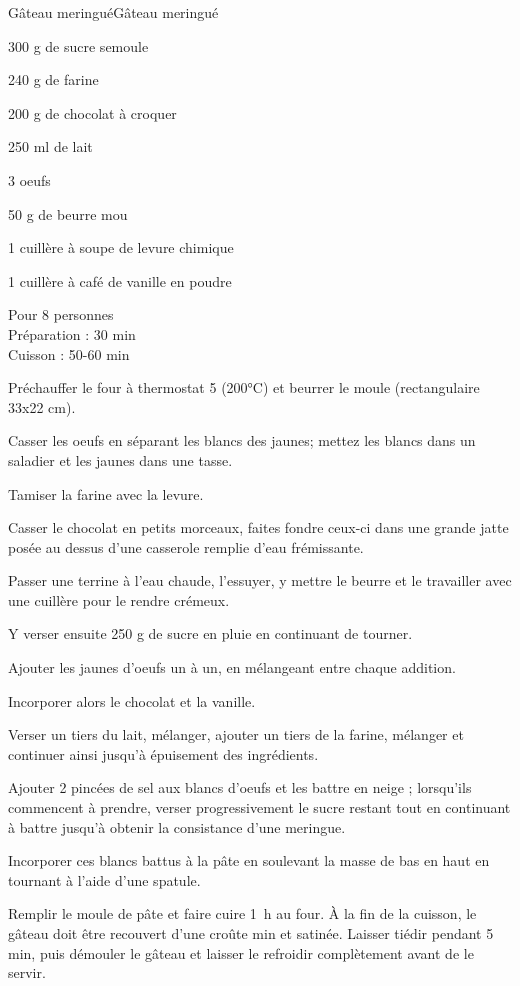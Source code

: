 \begin{recette}{Gâteau meringué}{Gâteau meringué}

\begin{ingredients}
300 g de sucre semoule\par
240 g de farine\par
200 g de chocolat à croquer\par
250 ml de lait\par
3 oeufs\par
50 g de beurre mou\par
1 cuillère à soupe de levure chimique\par
1 cuillère à café de vanille en poudre\par
\end{ingredients}

\begin{infos}
Pour 8 personnes\\
Préparation : 30 min\\
Cuisson : 50-60 min\\
\end{infos}

\begin{etapes}
\item Préchauffer le four à thermostat 5 (200°C) et beurrer le moule (rectangulaire 33x22 cm).
\item Casser les oeufs en séparant les blancs des jaunes; mettez les blancs dans un saladier et les jaunes dans une tasse.
\item Tamiser la farine avec la levure.
\item Casser le chocolat en petits morceaux, faites fondre ceux-ci dans une grande jatte posée au dessus d'une casserole remplie d'eau frémissante.
\item Passer une terrine à l'eau chaude, l'essuyer, y mettre le beurre et le travailler avec une cuillère pour le rendre crémeux.
\item Y verser ensuite 250 g de sucre en pluie en continuant de tourner.
\item Ajouter les jaunes d'oeufs un à un, en mélangeant entre chaque addition.
\item Incorporer alors le chocolat et la vanille.
\item Verser un tiers du lait, mélanger, ajouter un tiers de la farine, mélanger et continuer ainsi jusqu'à épuisement des ingrédients.
\item Ajouter 2 pincées de sel aux blancs d'oeufs et les battre en neige ; lorsqu'ils commencent à prendre, verser progressivement le sucre restant tout en continuant à battre jusqu'à obtenir la consistance d'une meringue.
\item Incorporer ces blancs battus à la pâte en soulevant la masse de bas en haut en tournant à l'aide d'une spatule.
\item Remplir le moule de pâte et faire cuire 1~h au four. À la fin de la cuisson, le gâteau doit être recouvert d'une croûte min et satinée. Laisser tiédir pendant 5 min, puis démouler le gâteau et laisser le refroidir complètement avant de le servir.
\end{etapes}

\end{recette}
